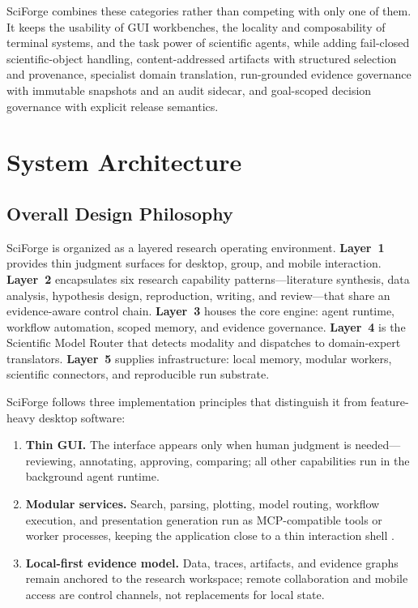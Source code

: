 \documentclass[sn-basic,Numbered,pdflatex]{sn-jnl}
\begin{document}
SciForge combines these categories rather than competing with only one of them. It keeps the usability of GUI workbenches, the locality and composability of terminal systems, and the task power of scientific agents, while adding fail-closed scientific-object handling, content-addressed artifacts with structured selection and provenance, specialist domain translation, run-grounded evidence governance with immutable snapshots and an audit sidecar, and goal-scoped decision governance with explicit release semantics.

\section{System Architecture}\label{sec:system-architecture}

\subsection{Overall Design Philosophy}

SciForge is organized as a layered research operating environment. \textbf{Layer~1} provides thin judgment surfaces for desktop, group, and mobile interaction. \textbf{Layer~2} encapsulates six research capability patterns---literature synthesis, data analysis, hypothesis design, reproduction, writing, and review---that share an evidence-aware control chain. \textbf{Layer~3} houses the core engine: agent runtime, workflow automation, scoped memory, and evidence governance. \textbf{Layer~4} is the Scientific Model Router that detects modality and dispatches to domain-expert translators. \textbf{Layer~5} supplies infrastructure: local memory, modular workers, scientific connectors, and reproducible run substrate.

SciForge follows three implementation principles that distinguish it from feature-heavy desktop software:

\begin{enumerate}
    \item \textbf{Thin GUI.} The interface appears only when human judgment is needed---reviewing, annotating, approving, comparing; all other capabilities run in the background agent runtime.
    \item \textbf{Modular services.} Search, parsing, plotting, model routing, workflow execution, and presentation generation run as MCP-compatible tools or worker processes, keeping the application close to a thin interaction shell \cite{anthropicMCP2024}.
    \item \textbf{Local-first evidence model.} Data, traces, artifacts, and evidence graphs remain anchored to the research workspace; remote collaboration and mobile access are control channels, not replacements for local state.
\end{enumerate}
\end{document}
